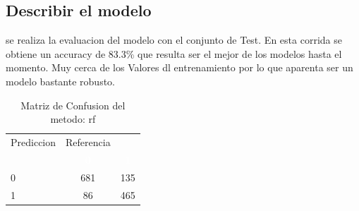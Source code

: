 \documentclass[]{article}
\begin{document}
\hypertarget{describir-el-modelo-5}{%
\subsection{Describir el modelo}\label{describir-el-modelo-5}}

se realiza la evaluacion del modelo con el conjunto de Test. En esta
corrida se obtiene un accuracy de 83.3\% que resulta ser el mejor de los
modelos hasta el momento. Muy cerca de los Valores dl entrenamiento por
lo que aparenta ser un modelo bastante robusto.

\begin{table}[!h]

\caption{\label{tab:MatrizConf_rf}Matriz de Confusion del metodo: rf }
\centering
\begin{tabular}[t]{lcc}
\toprule
\multicolumn{1}{c}{Prediccion} & \multicolumn{1}{c}{Referencia} & \multicolumn{1}{c}{ } \\
\cmidrule(l{3pt}r{3pt}){1-1} \cmidrule(l{3pt}r{3pt}){2-2}
\rowcolor{black}  \multicolumn{1}{c}{\textcolor{white}{\textbf{ }}} & \multicolumn{1}{c}{\textcolor{white}{\textbf{0}}} & \multicolumn{1}{c}{\textcolor{white}{\textbf{1}}}\\
\midrule
\rowcolor{gray!6}  0 & 681 & 135\\
1 & 86 & 465\\
\bottomrule
\end{tabular}
\end{table}
\end{document}
